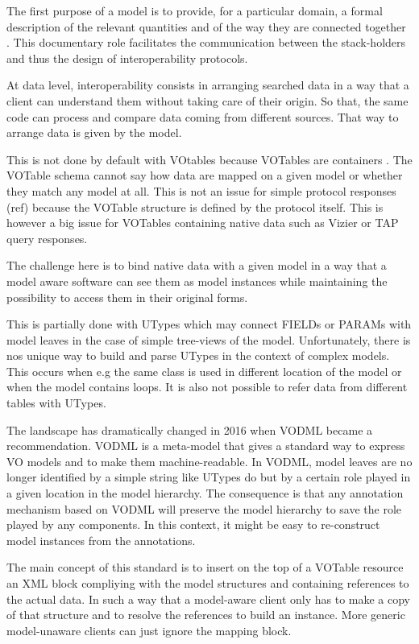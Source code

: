 
The first purpose of a model is to provide, for a particular domain, a formal description of the relevant quantities and of the way they are connected together .
This documentary role facilitates the communication between the stack-holders and thus the design of interoperability protocols. 

At data level, interoperability consists in arranging searched data in a way that a client can understand them without taking care of their origin. 
So that, the same code can process and compare data coming from different sources.  That way to arrange data is given by the model.

This is not done by default with VOtables because VOTables are containers \citep{2019ivoa.spec.1021O}. 
The VOTable schema cannot say how data are mapped on a given model or whether they match any model at all. 
This is not an issue for simple protocol responses (ref) because the VOTable structure is defined by the protocol itself. 
This is however a big issue for VOTables containing native data such as Vizier  or TAP query responses.

The challenge here is to bind native data with a given model in a way that a model aware software can see them as 
model instances while maintaining the possibility to access them in their original forms.

This is partially done with UTypes which may connect FIELDs or PARAMs with model leaves in the case of simple tree-views of the model. 
Unfortunately, there is nos unique  way to build and parse UTypes in the context of complex models. 
This occurs when e.g the same class is used in different location of the model or when the model contains loops. 
It is also not possible to refer data from different tables with  UTypes.

The landscape has dramatically changed in 2016 when VODML \citep{2018ivoa.spec.0910L} became a recommendation. 
VODML is a meta-model that gives a standard way to express VO models and to make them machine-readable.
In VODML, model leaves are no longer identified by a simple string like UTypes do but by a certain role played in a given location in the model hierarchy.
The consequence is that any annotation mechanism based on VODML will preserve the model hierarchy to save the role played by any components. 
In this context, it might be easy to re-construct model instances from the annotations. 

The main concept of this standard is to insert on the  top of a VOTable resource an XML block compliying with the 
model structures and containing references to the actual data.
In such a way that a model-aware client only has to make a copy of that structure and to resolve the references  
to build an instance. More generic model-unaware clients can just ignore the mapping block. 


